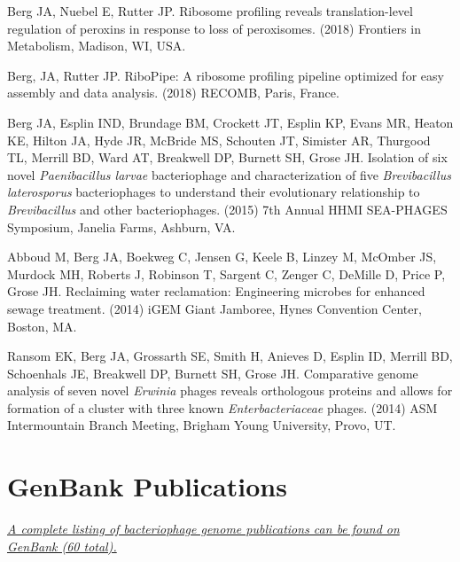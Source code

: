 \documentclass[margin,line]{res}
\begin{document}
\begin{resume}
Berg JA, Nuebel E, Rutter JP. Ribosome profiling reveals translation-level regulation of peroxins in response to loss of peroxisomes. (2018) Frontiers in Metabolism, Madison, WI, USA.

Berg, JA, Rutter JP.  RiboPipe: A ribosome profiling pipeline optimized for easy assembly and data analysis. (2018) RECOMB, Paris, France.

Berg JA, Esplin IND, Brundage BM, Crockett JT, Esplin KP, Evans MR, Heaton KE, Hilton JA, Hyde JR, McBride MS, Schouten JT, Simister AR, Thurgood TL, Merrill BD, Ward AT, Breakwell DP, Burnett SH, Grose JH. Isolation of six novel \textit{Paenibacillus larvae} bacteriophage and characterization of five \textit{Brevibacillus laterosporus} bacteriophages to understand their evolutionary relationship to \textit{Brevibacillus} and other bacteriophages. (2015) 7th Annual HHMI SEA-PHAGES Symposium, Janelia Farms, Ashburn, VA.

Abboud M, Berg JA, Boekweg C, Jensen G, Keele B, Linzey M, McOmber JS, Murdock MH, Roberts J, Robinson T, Sargent C, Zenger C, DeMille D, Price P, Grose JH. Reclaiming water reclamation: Engineering microbes for enhanced sewage treatment. (2014) iGEM Giant Jamboree, Hynes Convention Center, Boston, MA.

Ransom EK, Berg JA, Grossarth SE, Smith H, Anieves D, Esplin ID, Merrill BD, Schoenhals JE, Breakwell DP, Burnett SH, Grose JH. Comparative genome analysis of seven novel \textit{Erwinia} phages reveals orthologous proteins and allows for formation of a cluster with three known \textit{Enterbacteriaceae} phages. (2014) ASM Intermountain Branch Meeting, Brigham Young University, Provo, UT.


\section{\sc GenBank Publications}
\href{https://bit.ly/2NWJ25Q}{\textit{A complete listing of bacteriophage genome publications can be found on GenBank (60 total).}}



\end{resume}
\end{document}

